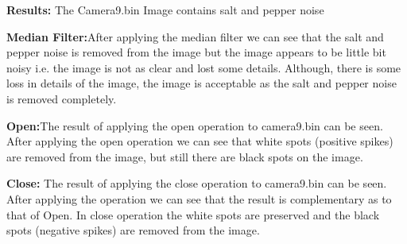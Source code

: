 \documentclass[11pt]{article} %
\begin{document}
\begin{flushleft}
\textbf{Results:} The Camera9.bin Image contains salt and pepper noise \break


\textbf{Median Filter:}After applying the median filter we can see that the salt and pepper noise is
removed from the image but the image appears to be little bit noisy i.e. the image is not as clear
and lost some details. Although, there is some loss in details of the image, the image is
acceptable as the salt and pepper noise is removed completely.\break


\textbf{Open:}The result of applying the open operation to camera9.bin can be seen. After applying the
open operation we can see that white spots (positive spikes) are removed from the image, but
still there are black spots on the image. \break


\textbf{Close:} The result of applying the close operation to camera9.bin can be seen. After applying the
operation we can see that the result is complementary as to that of Open. In close operation the
white spots are preserved and the black spots (negative spikes) are removed from the image.

\end{flushleft}
\end{document}
